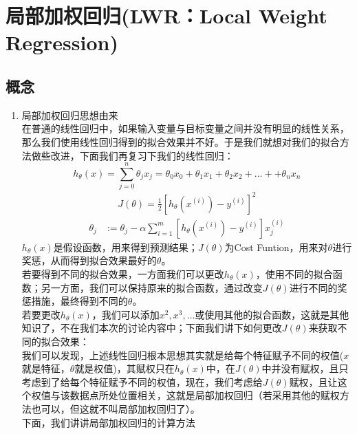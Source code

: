 \section{局部加权回归(LWR：Local Weight Regression)}
\subsection{概念}
\begin{enumerate}
	\item 局部加权回归思想由来 \\
	在普通的线性回归中，如果输入变量与目标变量之间并没有明显的线性关系，那么我们使用线性回归得到的拟合效果并不好。于是我们就想对我们的拟合方法做些改进，下面我们再复习下我们的线性回归：
	\begin{equation}
		h_{\theta}(x) = \sum_{j=0}^n \theta_jx_j = \theta_0x_0 + \theta_1x_1 + \theta_2x_2 + \dots +  + \theta_nx_n
	\end{equation}
	\begin{equation}\begin{aligned}
		J(\theta) = \frac{1}{2} \left[h_{\theta} {(x^{(i)})} - y^{(i)}\right]^2
	\end{aligned}\end{equation}
	\begin{equation}\begin{aligned}
		\theta_j &:= \theta_j - \alpha \sum_{i=1}^m \left[ h_\theta(x^{(i)}) - y^{(i)} \right]x_j^{(i)}
	\end{aligned}\end{equation}
	$h_\theta(x)$是假设函数，用来得到预测结果；$J(\theta)$为Cost Funtion，用来对$\theta$进行奖惩，从而得到拟合效果最好的$\theta$。\\
	若要得到不同的拟合效果，一方面我们可以更改$h_\theta(x)$，使用不同的拟合函数；另一方面，我们可以保持原来的拟合函数，通过改变$J(\theta)$进行不同的奖惩措施，最终得到不同的$\theta$。\\
	若要更改$h_\theta(x)$，我们可以添加$x^2, x^3, \dots$或使用其他的拟合函数，这就是其他知识了，不在我们本次的讨论内容中；下面我们讲下如何更改$J(\theta)$来获取不同的拟合效果：\\
	我们可以发现，上述线性回归根本思想其实就是给每个特征赋予不同的权值($x$就是特征，$\theta$就是权值)，其赋权只在$h_\theta(x)$中，在$J(\theta)$中并没有赋权，且只考虑到了给每个特征赋予不同的权值，现在，我们考虑给$J(\theta)$赋权，且让这个权值与该数据点所处位置相关，这就是局部加权回归（若采用其他的赋权方法也可以，但这就不叫局部加权回归了）。\\
	下面，我们讲讲局部加权回归的计算方法
\end{enumerate}

